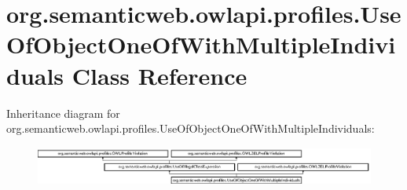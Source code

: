 \hypertarget{classorg_1_1semanticweb_1_1owlapi_1_1profiles_1_1_use_of_object_one_of_with_multiple_individuals}{\section{org.\-semanticweb.\-owlapi.\-profiles.\-Use\-Of\-Object\-One\-Of\-With\-Multiple\-Individuals Class Reference}
\label{classorg_1_1semanticweb_1_1owlapi_1_1profiles_1_1_use_of_object_one_of_with_multiple_individuals}
}
Inheritance diagram for org.\-semanticweb.\-owlapi.\-profiles.\-Use\-Of\-Object\-One\-Of\-With\-Multiple\-Individuals\-:\begin{figure}[H]
\begin{center}
\leavevmode
\includegraphics[height=1.264108cm]{classorg_1_1semanticweb_1_1owlapi_1_1profiles_1_1_use_of_object_one_of_with_multiple_individuals}
\end{center}
\end{figure}

